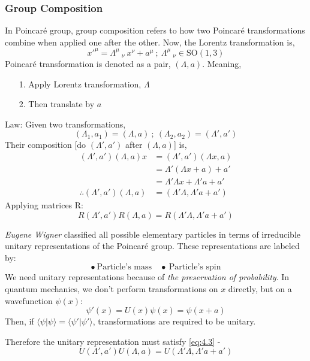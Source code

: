 \documentclass[14pt]{article} %
\begin{document}
\subsubsection{Group Composition}
In Poincaré group, group composition refers to how two Poincaré transformations combine when applied one after the other.
Now, the Lorentz transformation is,
$$x'^\mu = \Lambda^\mu~_\nu~x^\nu + a^\mu ~ ; ~\Lambda^\mu~_\nu \in \text{SO}(1,3)$$
Poincaré transformation is denoted as a pair, $(\Lambda, a)$. Meaning,
\begin{itemize}
    \item [1.] Apply Lorentz transformation, $\Lambda$ 
    \item [2.] Then translate by $a$
\end{itemize}
Law: 
Given two transformations,
$$
(\Lambda_1, a_1)=(\Lambda, a)~;~(\Lambda_2, a_2)=(\Lambda', a')
$$
Their composition [do $(\Lambda', a')$ after $(\Lambda, a)$] is,
\begin{align*}
    (\Lambda', a')(\Lambda, a)x &= (\Lambda', a')(\Lambda x, a) \\
                                &= \Lambda'(\Lambda x+a) + a' \\
                                &= \Lambda'\Lambda x+\Lambda' a + a' \\
  \therefore (\Lambda', a')(\Lambda, a) &= (\Lambda'\Lambda,\Lambda' a + a') \tag{4.2} \label{eq:4.2}
\end{align*}
Applying matrices R: 
\[R(\Lambda', a')R(\Lambda, a) = R(\Lambda'\Lambda,\Lambda' a + a') \tag{4.3} \label{eq:4.3}
\]
\begin{tcolorbox}[proofbox, title=\textbf{Question: Why Unitary representation}]
\textit{Eugene Wigner} classified all possible elementary particles in terms of irreducible unitary representations of the Poincaré group. These representations are labeled by:
\[
\bullet ~\text{Particle's mass}\quad \bullet ~\text{Particle's spin}
\]
We need unitary representations because of \textit{the preservation of probability}. In quantum mechanics, we don't perform transformations on $x$ directly, but on a wavefunction $\psi(x)$:
\[
\psi'(x) = U(x)\psi(x) = \psi(x+a)
\]
Then, if $\langle \psi | \psi \rangle = \langle \psi' | \psi' \rangle$, transformations are required to be unitary.
\end{tcolorbox}
Therefore the unitary representation must satisfy \eqref{eq:4.3} -
\[
U(\Lambda', a')U(\Lambda, a) = U(\Lambda'\Lambda,\Lambda' a + a') \tag{4.4} \label{eq:4.4}
\]
\end{document}
